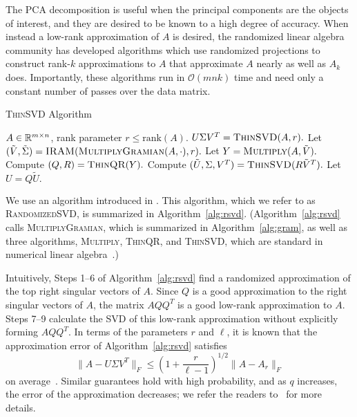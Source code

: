 The PCA decomposition is useful when the principal components are the objects of interest, and they are
desired to be known to a high degree of accuracy. When instead a low-rank approximation of $A$ is desired,
the randomized linear algebra community has developed algorithms which use randomized projections to
construct rank-$k$ approximations to $A$ that approximate $A$ nearly as well as $A_k$ does. Importantly,
these algorithms run in $\mathcal{O}(mn k)$ time and need only a constant number of passes over the data matrix.

\begin{algorithm}[tb]
  \caption{\textsc{ThinSVD} Algorithm}
  \label{alg:thinSVD}
  \begin{algorithmic}[1]
    \Require $A \in \mathbb{R}^{m\times n}$, rank parameter $r \leq \textrm{rank}(A).$
    \Ensure $U \Sigma V^T = \textsc{ThinSVD}(A, r).$
    \State Let $(\tilde{V}, \tilde{\Sigma}) = \textsc{IRAM}(\textsc{MultiplyGramian}(A, \cdot), r).$
    \State Let $Y = \textsc{Multiply}(A, \tilde{V}).$
    \State Compute $(Q, R) = \textsc{ThinQR}(Y).$
    \State Compute $(\tilde{U}, \Sigma, V^T) = \textsc{ThinSVD}(R \tilde{V}^T).$
    \State Let $U = Q \tilde{U}.$  
  \end{algorithmic}
\end{algorithm}

We use an algorithm introduced in \cite{MRT06,MRT11}.
This algorithm, which
we refer to as \textsc{RandomizedSVD}, is summarized in
Algorithm~\ref{alg:rsvd}.  (Algorithm~\ref{alg:rsvd} calls
\textsc{MultiplyGramian}, which is summarized in Algorithm~\ref{alg:gram}, as
well as three algorithms, \textsc{Multiply}, \textsc{ThinQR}, and
\textsc{ThinSVD}, which are standard in numerical linear algebra~\cite{GVL96}.)

Intuitively, Steps 1--6 of Algorithm~\ref{alg:rsvd} find a randomized approximation of the
top right singular vectors of $A$. Since $Q$ is a good approximation to the right singular vectors of
$A$, the matrix $AQQ^T$ is a good low-rank approximation to $A$. Steps 7--9 calculate the SVD
of this low-rank approximation without explicitly forming $AQQ^T.$ 
In terms of the parameters $r$ and $\ell$, it is known that the approximation error of Algorithm~\ref{alg:rsvd} satisfies
\[
  \|A - U\Sigma V^T\|_F \leq \left(1 + \frac{r}{\ell - 1}\right)^{1/2} \|A - A_r\|_F 
\]
on average~\cite{HMT09_SIREV}. Similar guarantees hold with high probability, and as $q$ increases, the error of the approximation decreases; we refer the readers
to~\cite{HMT09_SIREV,Mah-mat-rev_BOOK} for more details. 

